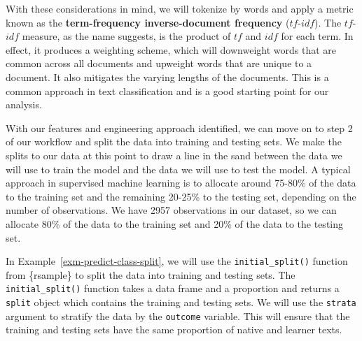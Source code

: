 \documentclass[
  letterpaper,
  krantz1]{latex/krantz-mod}
\theoremstyle{definition}
\theoremstyle{definition}
\theoremstyle{remark}
\begin{document}
With these considerations in mind, we will tokenize by words and apply a
metric known as the \textbf{term-frequency inverse-document frequency}
(\(tf\)-\(idf\)).
The \(tf\)-\(idf\) measure, as the name suggests, is the product of
\(tf\) and \(idf\) for each term. In effect, it produces a weighting
scheme, which will downweight words that are common across all documents
and upweight words that are unique to a document. It also mitigates the
varying lengths of the documents. This is a common approach in text
classification and is a good starting point for our
analysis.

With our features and engineering approach identified, we can move on to
step 2 of our workflow and split the data into training and testing
sets. We make the splits to our data at this point to draw a line in the
sand between the data we will use to train the model and the data we
will use to test the model. A typical approach in supervised machine
learning is to allocate around 75-80\% of the
data to the training set and the remaining 20-25\% to the testing set,
depending on the number of observations. We have
2957 observations in our dataset, so we can allocate 80\% of the data to
the training set and 20\% of the data to the testing set.

In Example~\ref{exm-predict-class-split}, we will use the
\texttt{initial\_split()} function from \{rsample\} to split the data
into training and testing sets. The \texttt{initial\_split()} function
takes a data frame and a proportion and returns a \texttt{split} object
which contains the training and testing sets. We will use the
\texttt{strata} argument to stratify the data by the \texttt{outcome}
variable. This will ensure that the training and testing sets have the
same proportion of native and learner texts.

\pagebreak
\end{document}

